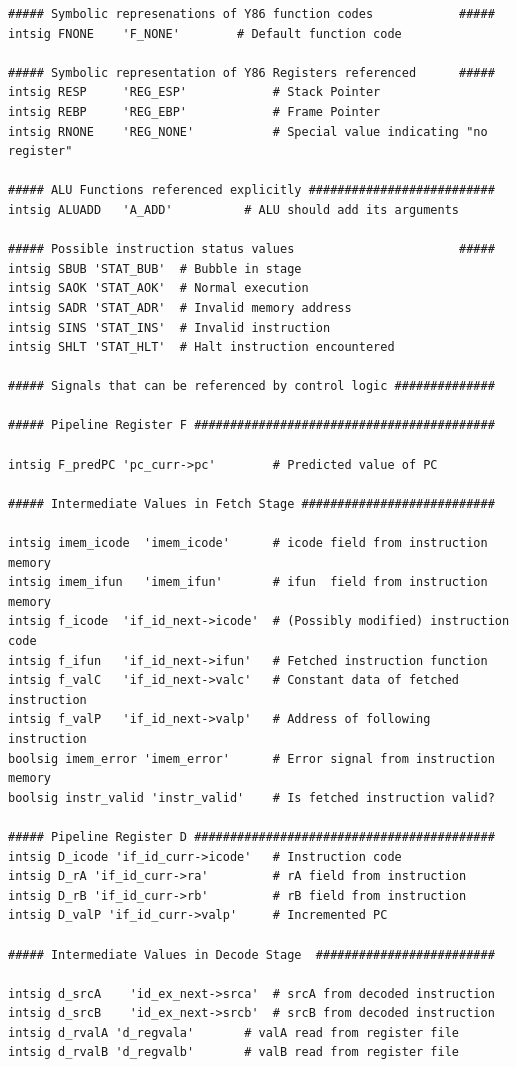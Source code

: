 \documentclass{article}
\begin{document}
\begin{lstlisting}[numberstyle=\scriptsize, basicstyle=\scriptsize]
##### Symbolic represenations of Y86 function codes            #####
intsig FNONE    'F_NONE'        # Default function code

##### Symbolic representation of Y86 Registers referenced      #####
intsig RESP     'REG_ESP'    	     # Stack Pointer
intsig REBP     'REG_EBP'    	     # Frame Pointer
intsig RNONE    'REG_NONE'   	     # Special value indicating "no register"

##### ALU Functions referenced explicitly ##########################
intsig ALUADD	'A_ADD'		     # ALU should add its arguments

##### Possible instruction status values                       #####
intsig SBUB	'STAT_BUB'	# Bubble in stage
intsig SAOK	'STAT_AOK'	# Normal execution
intsig SADR	'STAT_ADR'	# Invalid memory address
intsig SINS	'STAT_INS'	# Invalid instruction
intsig SHLT	'STAT_HLT'	# Halt instruction encountered

##### Signals that can be referenced by control logic ##############

##### Pipeline Register F ##########################################

intsig F_predPC 'pc_curr->pc'	     # Predicted value of PC

##### Intermediate Values in Fetch Stage ###########################

intsig imem_icode  'imem_icode'      # icode field from instruction memory
intsig imem_ifun   'imem_ifun'       # ifun  field from instruction memory
intsig f_icode	'if_id_next->icode'  # (Possibly modified) instruction code
intsig f_ifun	'if_id_next->ifun'   # Fetched instruction function
intsig f_valC	'if_id_next->valc'   # Constant data of fetched instruction
intsig f_valP	'if_id_next->valp'   # Address of following instruction
boolsig imem_error 'imem_error'	     # Error signal from instruction memory
boolsig instr_valid 'instr_valid'    # Is fetched instruction valid?

##### Pipeline Register D ##########################################
intsig D_icode 'if_id_curr->icode'   # Instruction code
intsig D_rA 'if_id_curr->ra'	     # rA field from instruction
intsig D_rB 'if_id_curr->rb'	     # rB field from instruction
intsig D_valP 'if_id_curr->valp'     # Incremented PC

##### Intermediate Values in Decode Stage  #########################

intsig d_srcA	 'id_ex_next->srca'  # srcA from decoded instruction
intsig d_srcB	 'id_ex_next->srcb'  # srcB from decoded instruction
intsig d_rvalA 'd_regvala'	     # valA read from register file
intsig d_rvalB 'd_regvalb'	     # valB read from register file


\end{lstlisting}
\end{document}
